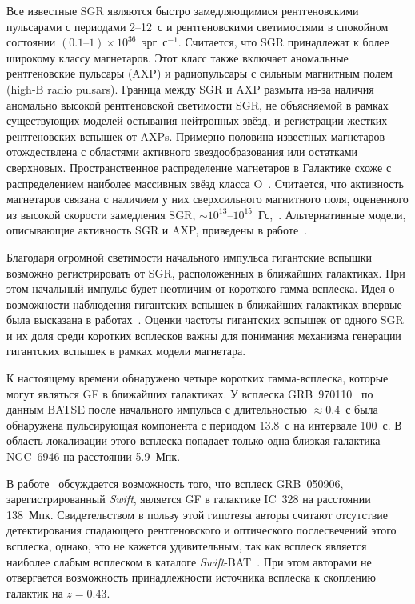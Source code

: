 Все известные SGR являются быстро замедляющимися рентгеновскими пульсарами 
с периодами 2--12~с и рентгеновскими светимостями в спокойном состоянии 
$(0.1\textrm{--}1)\times 10^{36}$~эрг~с$^{-1}$. Считается, что SGR принадлежат к 
более широкому классу магнетаров. Этот класс также включает аномальные 
рентгеновские пульсары (AXP) и радиопульсары с сильным магнитным полем (high-B radio pulsars).
Граница между SGR и AXP размыта из-за наличия аномально высокой рентгеновской светимости SGR,
не объясняемой в рамках существующих моделей остывания нейтронных звёзд, 
и регистрации жестких рентгеновских вспышек от AXPs. Примерно половина известных 
магнетаров отождествлена с областями активного звездообразования или остатками сверхновых.
Пространственное распределение магнетаров в Галактике схоже с распределением 
наиболее массивных звёзд класса O~\citep{Olausen_Kaspi2014}. Считается, что 
активность магнетаров связана с наличием у них сверхсильного магнитного поля,
оцененного из высокой скорости замедления SGR, 
$\sim 10^{13}\textrm{--}10^{15}$~Гс,~\citep{Duncan_and_Thompson_1992ApJ,Thompson_and_Duncan_1995MNRAS,Thompson_and_Duncan_1996ApJ}.
Альтернативные модели, описывающие активность SGR и AXP, приведены в работе~\citep{Bisnovatyi-Kogan_2014ARep}.

Благодаря огромной светимости начального импульса гигантские вспышки возможно  
регистрировать от SGR, расположенных в ближайших галактиках. При этом начальный 
импульс будет неотличим от короткого гамма-всплеска. Идея о возможности наблюдения 
гигантских вспышек в ближайших галактиках впервые была высказана 
в работах~\citep{Mazets1981,Mazets1982}. Оценки частоты гигантских вспышек от одного 
SGR и их доля среди коротких всплесков важны для понимания механизма генерации 
гигантских вспышек в рамках модели магнетара.

К настоящему времени обнаружено четыре коротких гамма-всплеска, которые могут 
являться GF в ближайших галактиках. У всплеска GRB~970110~\citep{Crider2006} 
по данным BATSE после начального импульса с длительностью $\approx 0.4$~с была 
обнаружена пульсирующая компонента с периодом 13.8~с на интервале 100~с. В область 
локализации этого всплеска попадает только одна близкая галактика NGC~6946 
на расстоянии 5.9~Мпк. 

В работе~\citep{Levan2008} обсуждается возможность того, что всплеск GRB~050906, 
зарегистрированный \textit{Swift}, является GF в галактике 
IC~328 на расстоянии 138~Мпк. Свидетельством в пользу этой гипотезы авторы считают  
отсутствие детектирования спадающего рентгеновского и оптического послесвечений этого всплеска, 
однако, это не кажется удивительным, так как всплеск является наиболее слабым всплеском 
в каталоге \textit{Swift}-BAT~\citep{Sakamoto2011ApJS}. При этом 
авторами не отвергается возможность принадлежности источника всплеска к скоплению 
галактик на $z = 0.43$. 

